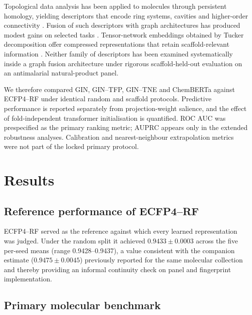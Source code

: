 \documentclass[11pt,a4paper]{article}
\begin{document}
Topological data analysis has been applied to molecules through persistent homology, yielding descriptors that encode ring systems, cavities and higher-order connectivity \citep{tda_review_2025}. Fusion of such descriptors with graph architectures has produced modest gains on selected tasks \citep{topology_molecular_representations_2025}. Tensor-network embeddings obtained by Tucker decomposition offer compressed representations that retain scaffold-relevant information \citep{tn_efficient_2026}. Neither family of descriptors has been examined systematically inside a graph fusion architecture under rigorous scaffold-held-out evaluation on an antimalarial natural-product panel.

We therefore compared GIN, GIN--TFP, GIN--TNE and ChemBERTa against ECFP4--RF under identical random and scaffold protocols. Predictive performance is reported separately from projection-weight salience, and the effect of fold-independent transformer initialisation is quantified. ROC AUC was prespecified as the primary ranking metric; AUPRC appears only in the extended robustness analyses. Calibration and nearest-neighbour extrapolation metrics were not part of the locked primary protocol.

\section{Results}

\subsection{Reference performance of ECFP4--RF}

ECFP4--RF served as the reference against which every learned representation was judged. Under the random split it achieved $\num{0.9433} \pm \num{0.0003}$ across the five per-seed means (range \num{0.9428}--\num{0.9437}), a value consistent with the companion estimate ($\num{0.9475} \pm \num{0.0045}$) previously reported for the same molecular collection \citep{temgoua2027quantum} and thereby providing an informal continuity check on panel and fingerprint implementation.

\subsection{Primary molecular benchmark}
\end{document}
